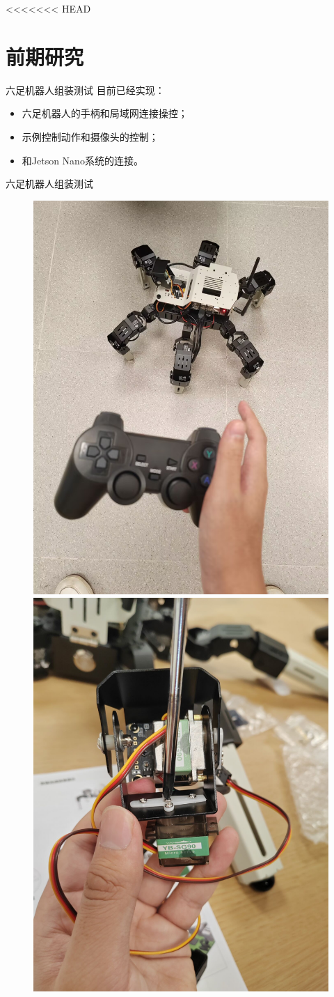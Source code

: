 \documentclass{beamer}
\begin{document}
<<<<<<< HEAD
\section{前期研究}

\begin{frame}{六足机器人组装测试}
    目前已经实现：
    \begin{itemize}
        \item 六足机器人的手柄和局域网连接操控；
        \item 示例控制动作和摄像头的控制；
        \item 和Jetson Nano系统的连接。
    \end{itemize}
\end{frame}

\begin{frame}{六足机器人组装测试}
    \begin{figure}[htpb]
        \centering
        \includegraphics[width=0.49\linewidth]{pic/hex.jpg}
        \includegraphics[width=0.49\linewidth]{pic/constr.jpg}
    \end{figure}
\end{frame}
\end{document}
